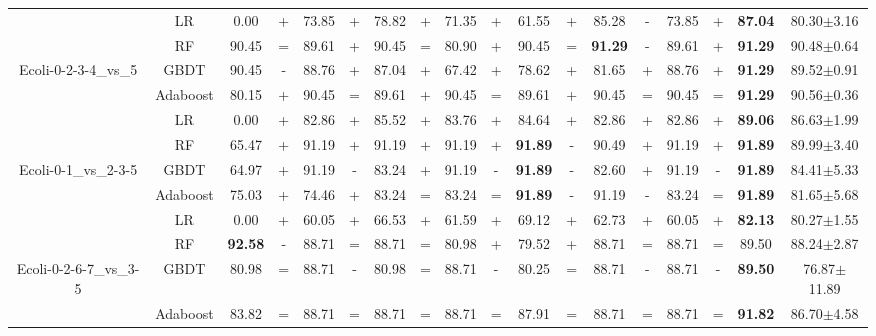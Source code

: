 \documentclass[journal]{IEEEtran}
\begin{document}
\begin{table*}
\begin{threeparttable}
\begin{tabular}{|c|c|cc|cc|cc|cc|cc|cc|cc|cc|}
			& LR    & 0.00  & +     & 73.85  & +     & 78.82  & +     & 71.35  & +     & 61.55  & +     & 85.28  & -     & 73.85  & +     & \textbf{87.04}  & 80.30$\pm$3.16  \\
			& RF    & 90.45  & =     & 89.61  & +     & 90.45  & =     & 80.90  & +     & 90.45  & =     & \textbf{91.29}  & -     & 89.61  & +     & \textbf{91.29}  & 90.48$\pm$0.64  \\
			Ecoli-0-2-3-4\_vs\_5
			& GBDT  & 90.45  & -     & 88.76  & +     & 87.04  & +     & 67.42  & +     & 78.62  & +     & 81.65  & +     & 88.76  & +     & \textbf{91.29}  & 89.52$\pm$0.91  \\
			& Adaboost & 80.15  & +     & 90.45  & =     & 89.61  & +     & 90.45  & =     & 89.61  & +     & 90.45  & =     & 90.45  & =     & \textbf{91.29}  & 90.56$\pm$0.36  \\
			\hline
			
			& LR    & 0.00  & +     & 82.86  & +     & 85.52  & +     & 83.76  & +     & 84.64  & +     & 82.86  & +     & 82.86  & +     & \textbf{89.06}  & 86.63$\pm$1.99  \\
			& RF    & 65.47  & +     & 91.19  & +     & 91.19  & +     & 91.19  & +     & \textbf{91.89}  & -     & 90.49  & +     & 91.19  & +     & \textbf{91.89}  & 89.99$\pm$3.40  \\
			Ecoli-0-1\_vs\_2-3-5
			& GBDT  & 64.97  & +     & 91.19  & -     & 83.24  & +     & 91.19  & -     &\textbf{91.89}  & -     & 82.60  & +     & 91.19  & -     & \textbf{91.89}  & 84.41$\pm$5.33  \\
			& Adaboost & 75.03  & +     & 74.46  & +     & 83.24  & =     & 83.24  & =     & \textbf{91.89}  & -     & 91.19  & -     & 83.24  & =     & \textbf{91.89}  & 81.65$\pm$5.68  \\
			\hline
			
			& LR    & 0.00  & +     & 60.05  & +     & 66.53  & +     & 61.59  & +     & 69.12  & +     & 62.73  & +     & 60.05  & +     & \textbf{82.13}  & 80.27$\pm$1.55  \\
			& RF    & \textbf{92.58}  & -     & 88.71  & =     & 88.71  & =     & 80.98  & +     & 79.52  & +     & 88.71  & =     & 88.71  & =     & 89.50  & 88.24$\pm$2.87  \\
			Ecoli-0-2-6-7\_vs\_3-5
			& GBDT  & 80.98  & =     & 88.71  & -     & 80.98  & =     & 88.71  & -     & 80.25  & =     & 88.71  & -     & 88.71  & -     & \textbf{89.50}  & 76.87$\pm$11.89  \\
			& Adaboost & 83.82  & =     & 88.71  & =     & 88.71  & =     & 88.71  & =     & 87.91  & =     & 88.71  & =     & 88.71  & =     & \textbf{91.82}  & 86.70$\pm$4.58  \\
			\hline
			

\end{tabular}
\end{threeparttable}
\end{table*}
\end{document}
